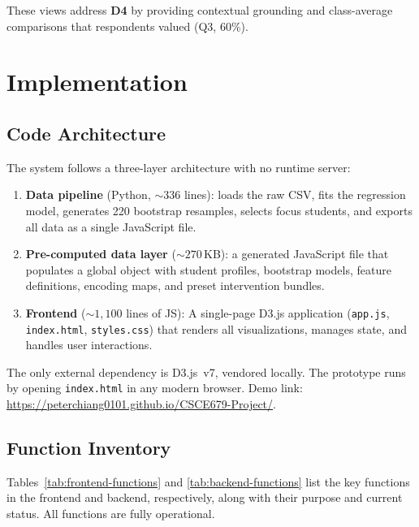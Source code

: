 \documentclass[11pt]{article}
\begin{document}
These views address \textbf{D4} by providing contextual grounding and class-average comparisons that respondents valued (Q3, 60\%).

\section{Implementation}
\label{sec:implementation}

\subsection{Code Architecture}

The system follows a three-layer architecture with no runtime server:

\begin{enumerate}
  \item \textbf{Data pipeline} (Python, ${\sim}336$ lines): loads the raw CSV, fits the regression model, generates 220 bootstrap resamples, selects focus students, and exports all data as a single JavaScript file.
  \item \textbf{Pre-computed data layer} (${\sim}270$\,KB): a generated JavaScript file that populates a global object with student profiles, bootstrap models, feature definitions, encoding maps, and preset intervention bundles.
  \item \textbf{Frontend} (${\sim}1{,}100$ lines of JS): A single-page D3.js application (\texttt{app.js}, \texttt{index.html}, \texttt{styles.css}) that renders all visualizations, manages state, and handles user interactions.
\end{enumerate}

The only external dependency is D3.js~v7, vendored locally. The prototype runs by opening \texttt{index.html} in any modern browser. Demo link: \url{https://peterchiang0101.github.io/CSCE679-Project/}.

\subsection{Function Inventory}

Tables~\ref{tab:frontend-functions} and \ref{tab:backend-functions} list the key functions in the frontend and backend, respectively, along with their purpose and current status. All functions are fully operational.
\end{document}
